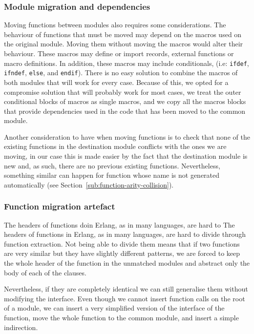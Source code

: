 \subsubsection{Module migration and dependencies}

Moving functions between modules also requires some considerations.
The behaviour of functions that must be moved may depend on the macros
used on the original module. Moving them without moving the macros
would alter their behaviour. These macros may define or import records,
external functions or macro definitions. In addition, these macros
may include conditionals, (i.e: \texttt{ifdef}, \texttt{ifndef}, \texttt{else},
and \texttt{endif}). There is no easy solution to combine the macros
of both modules that will work for every case. Because of this, we
opted for a compromise solution that will probably work for most cases,
we treat the outer conditional blocks of macros as single macros,
and we copy all the macros blocks that provide dependencies used in
the code that has been moved to the common module.

Another consideration to have when moving functions is to check that
none of the existing functions in the destination module conflicts
with the ones we are moving, in our case this is made easier by the
fact that the destination module is new and, as such, there are no
previous existing functions. Nevertheless, something similar can happen
for function whose name is not generated automatically (see 
Section~\ref{sub:function-arity-collision}).


\subsubsection{Function migration 
artefact\label{sub:function-migration-artefact}}
The headers of functions doin Erlang, as in many languages, are hard to
The headers of functions in Erlang, as in many languages, are hard to
divide through function extraction. Not being able to divide them
means that if two functions are very similar but they have slightly
different patterns, we are forced to keep the whole header of the
function in the unmatched modules and abstract only the body of each
of the clauses.

Nevertheless, if they are completely identical we can still generalise
them without modifying the interface. Even though we cannot insert
function calls on the root of a module, we can insert a very simplified
version of the interface of the function, move the whole function to the
common module, and insert a simple indirection.

